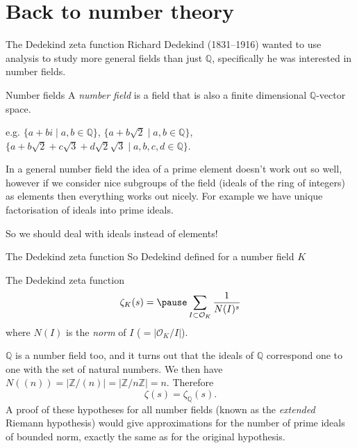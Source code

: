 \documentclass{beamer}
\begin{document}
\section[Number theory again]{Back to number theory}
\begin{frame}{The Dedekind zeta function}
Richard Dedekind (1831--1916) wanted to use analysis to study more general fields than just $\mathbb{Q}$, specifically he was interested in number fields.

\pause \begin{block}{Number fields}
A \emph{number field} is a field that is also a finite dimensional $\mathbb{Q}$-vector space.
\end{block}

\pause e.g. $\{a+bi\mid a,b\in\mathbb{Q}\}$, \pause $\{a+b\sqrt{2}\mid a,b\in\mathbb{Q}\}$, \pause $\{a+b\sqrt{2} +c\sqrt{3}+d\sqrt{2}\sqrt{3}\mid a,b,c,d\in\mathbb{Q}\}$.

\pause In a general number field the idea of a prime element doesn't work out so well, however if we consider nice subgroups of the field (ideals of the ring of integers) as elements then everything works out nicely.
\pause For example we have unique factorisation of ideals into prime ideals.

\pause So we should deal with ideals instead of elements!
\end{frame}

\begin{frame}{The Dedekind zeta function}
So Dedekind defined for a number field $K$
\begin{block}{The Dedekind zeta function}
\[\zeta_K(s) = \pause \sum_{I\subset \mathcal{O}_K} \frac{1}{N(I)^s}\]
where $N(I)$ is the \emph{norm} of $I$ ($ = |\mathcal{O}_K/I|$). 
\end{block}
\pause $\mathbb{Q}$ is a number field too, and it turns out that the ideals of $\mathbb{Q}$ correspond one to one with the set of natural numbers.
We then have $N((n)) = |\mathbb{Z}/(n)|= |\mathbb{Z}/n\mathbb{Z}| = n$.
\pause Therefore
\[\zeta(s) = \zeta_\mathbb{Q}(s).\]
\pause A proof of these hypotheses for all number fields (known as the \emph{extended} Riemann hypothesis) would give approximations for the number of prime ideals of bounded norm, exactly the same as for the original hypothesis.
\end{frame}
\end{document}
